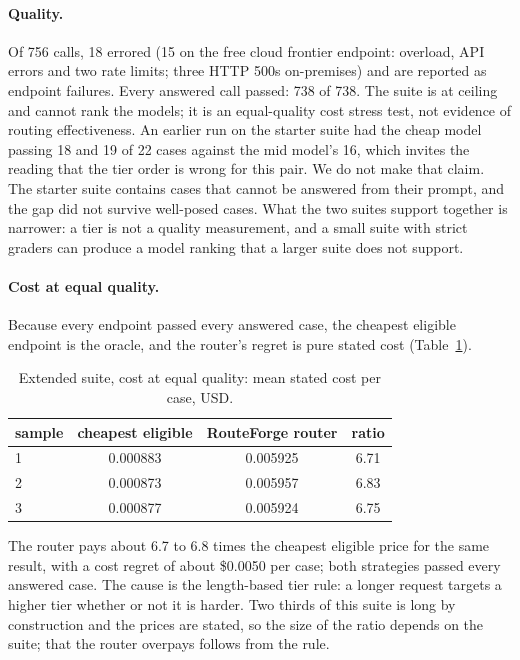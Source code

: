 \documentclass[11pt]{article}
\begin{document}
\paragraph{Quality.} Of 756 calls, 18 errored (15 on the free cloud frontier endpoint:
overload, API errors and two rate limits; three HTTP 500s on-premises) and are reported as
endpoint failures. Every answered call passed: 738 of 738. The suite is at ceiling and cannot
rank the models; it is an equal-quality cost stress test, not evidence of routing
effectiveness. An earlier run on the starter suite had the cheap model passing 18 and 19 of 22
cases against the mid model's 16, which invites the reading that the tier order is wrong for
this pair. We do not make that claim. The starter suite contains cases that cannot be
answered from their prompt, and the gap did not survive well-posed cases. What the two suites
support together is narrower: a tier is not a quality measurement, and a small suite with
strict graders can produce a model ranking that a larger suite does not support.

\paragraph{Cost at equal quality.} Because every endpoint passed every answered case, the
cheapest eligible endpoint is the oracle, and the router's regret is pure stated cost
(Table~\ref{tab:regret}).

\begin{table}[t]
\centering
\small
\caption{Extended suite, cost at equal quality: mean stated cost per case, USD.}
\label{tab:regret}
\begin{tabular}{@{}lccc@{}}
\toprule
sample & cheapest eligible & RouteForge router & ratio \\
\midrule
1 & 0.000883 & 0.005925 & 6.71 \\
2 & 0.000873 & 0.005957 & 6.83 \\
3 & 0.000877 & 0.005924 & 6.75 \\
\bottomrule
\end{tabular}
\end{table}

The router pays about 6.7 to 6.8 times the cheapest eligible price for the same result, with a
cost regret of about \$0.0050 per case; both strategies passed every answered case. The cause is
the length-based tier rule: a longer request targets a higher tier whether or not it is harder.
Two thirds of this suite is long by construction and the prices are stated, so the size of
the ratio depends on the suite; that the router overpays follows from the rule.
\end{document}
